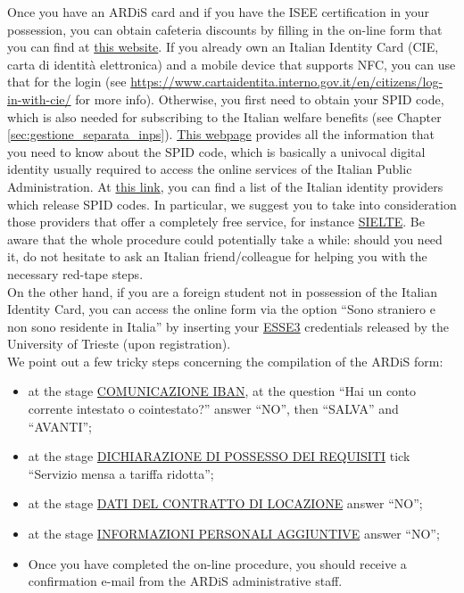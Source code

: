 \documentclass{sissavademecum}
\begin{document}
Once you have an ARDiS card and if you have the ISEE certification in your possession, you can obtain cafeteria discounts by filling in the on-line form that you can find at \href{https://ardiss-sol.dirittoallostudio.it/apps/V3.1/sol/public/}{this website}. If you already own an Italian Identity Card (CIE, carta di identit\`a elettronica) and a mobile device that supports NFC, you can use that for the login (see \href{https://www.cartaidentita.interno.gov.it/en/citizens/log-in-with-cie/}{https://www.cartaidentita.interno.gov.it/en/citizens/log-in-with-cie/} for more info). Otherwise, you first need to obtain your SPID code, which is also needed for subscribing to the Italian welfare benefits (see Chapter \ref{sec:gestione_separata_inps}). \href{https://www.spid.gov.it/en/}{This webpage} provides all the information that you need to know about the SPID code, which is basically a univocal digital identity usually required to access the online services of the Italian Public Administration. At \href{https://www.spid.gov.it/en/what-is-spid/how-to-choose-between-digital-identity-providers/}{this link}, you can find a list of the Italian identity providers which release SPID codes. In particular, we suggest you to take into consideration those providers that offer a completely free service, for instance \href{https://myid.sieltecloud.it/signup/}{SIELTE}. Be aware that the whole procedure could potentially take a while: should you need it, do not hesitate to ask an Italian friend/colleague for helping you with the necessary red-tape steps. \\
On the other hand, if you are a foreign student not in possession of the Italian Identity Card, you can access the online form via the option ``Sono straniero e non sono residente in Italia'' by inserting your \href{https://esse3.units.it/Home.do;jsessionid=D45A69198D3F77C3C4C108114BD43A50.esse3-units-prod-03?cod_lingua=eng}{ESSE3} credentials released by the University of Trieste (upon registration). \\
We point out a few tricky steps concerning the compilation of the ARDiS form:
\begin{itemize}
    \item at the stage \underline{COMUNICAZIONE IBAN}, at the question ``Hai un conto corrente intestato o cointestato?'' answer ``NO'', then ``SALVA'' and ``AVANTI'';
    \item at the stage \underline{DICHIARAZIONE DI POSSESSO DEI REQUISITI} tick ``Servizio mensa a tariffa ridotta'';
    \item at the stage \underline{DATI DEL CONTRATTO DI LOCAZIONE} answer ``NO'';
    \item at the stage \underline{INFORMAZIONI PERSONALI AGGIUNTIVE} answer ``NO'';
    \item Once you have completed the on-line procedure, you should receive a confirmation e-mail from the ARDiS administrative staff.
\end{itemize}
\end{document}
